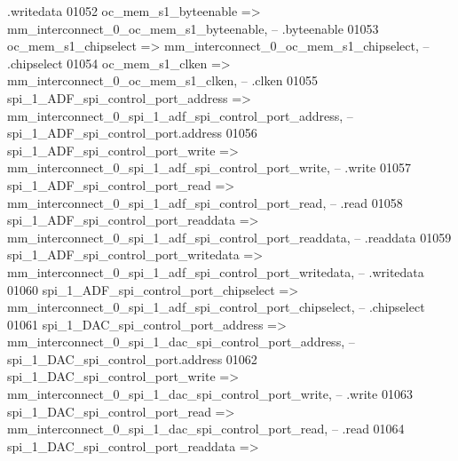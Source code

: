 \begin{DoxyCode}
{       .writedata}
01052             oc\_mem\_s1\_byteenable                        => 
      mm_interconnect_0_oc_mem_s1_byteenable,\textcolor{keyword}{                      --                                     
       .byteenable}
01053             oc\_mem\_s1\_chipselect                        => 
      mm_interconnect_0_oc_mem_s1_chipselect,\textcolor{keyword}{                      --                                     
       .chipselect}
01054             oc\_mem\_s1\_clken                             => 
      mm_interconnect_0_oc_mem_s1_clken,\textcolor{keyword}{                           --                                      .clken}
01055             spi\_1\_ADF\_spi\_control\_port\_address          => 
      mm_interconnect_0_spi_1_adf_spi_control_port_address,\textcolor{keyword}{        --           
       spi\_1\_ADF\_spi\_control\_port.address}
01056             spi\_1\_ADF\_spi\_control\_port\_write            => 
      mm_interconnect_0_spi_1_adf_spi_control_port_write,\textcolor{keyword}{          --                                      .write}
01057             spi\_1\_ADF\_spi\_control\_port\_read             => 
      mm_interconnect_0_spi_1_adf_spi_control_port_read,\textcolor{keyword}{           --                                      .read}
01058             spi\_1\_ADF\_spi\_control\_port\_readdata         => 
      mm_interconnect_0_spi_1_adf_spi_control_port_readdata,\textcolor{keyword}{       --                                     
       .readdata}
01059             spi\_1\_ADF\_spi\_control\_port\_writedata        => 
      mm_interconnect_0_spi_1_adf_spi_control_port_writedata,\textcolor{keyword}{      --                                     
       .writedata}
01060             spi\_1\_ADF\_spi\_control\_port\_chipselect       => 
      mm_interconnect_0_spi_1_adf_spi_control_port_chipselect,\textcolor{keyword}{     --                                     
       .chipselect}
01061             spi\_1\_DAC\_spi\_control\_port\_address          => 
      mm_interconnect_0_spi_1_dac_spi_control_port_address,\textcolor{keyword}{        --           
       spi\_1\_DAC\_spi\_control\_port.address}
01062             spi\_1\_DAC\_spi\_control\_port\_write            => 
      mm_interconnect_0_spi_1_dac_spi_control_port_write,\textcolor{keyword}{          --                                      .write}
01063             spi\_1\_DAC\_spi\_control\_port\_read             => 
      mm_interconnect_0_spi_1_dac_spi_control_port_read,\textcolor{keyword}{           --                                      .read}
01064             spi\_1\_DAC\_spi\_control\_port\_readdata         => 

\end{DoxyCode}
